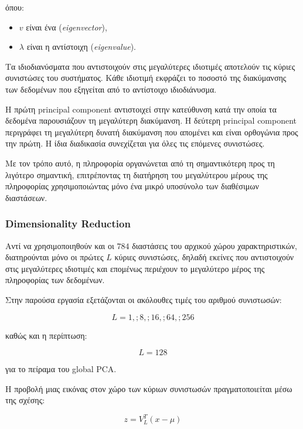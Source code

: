 \documentclass[12pt]{article}
\begin{document}
όπου:

\begin{itemize}
\item $v$ είναι ένα (\textit{eigenvector}),
\item $\lambda$ είναι η αντίστοιχη (\textit{eigenvalue}).
\end{itemize}

Τα ιδιοδιανύσματα που αντιστοιχούν στις μεγαλύτερες ιδιοτιμές αποτελούν τις κύριες συνιστώσες του συστήματος. Κάθε ιδιοτιμή εκφράζει το ποσοστό της 
διακύμανσης των δεδομένων που εξηγείται από το αντίστοιχο ιδιοδιάνυσμα.

Η πρώτη principal component αντιστοιχεί στην κατεύθυνση κατά την οποία τα δεδομένα παρουσιάζουν τη μεγαλύτερη διακύμανση. Η δεύτερη principal component 
περιγράφει τη μεγαλύτερη δυνατή διακύμανση που απομένει και είναι ορθογώνια προς την πρώτη. Η ίδια διαδικασία συνεχίζεται για όλες τις επόμενες 
συνιστώσες.

Με τον τρόπο αυτό, η πληροφορία οργανώνεται από τη σημαντικότερη προς τη λιγότερο σημαντική, επιτρέποντας τη διατήρηση του μεγαλύτερου μέρους της 
πληροφορίας χρησιμοποιώντας μόνο ένα μικρό υποσύνολο των διαθέσιμων διαστάσεων.


\subsubsection{Dimensionality Reduction}
Αντί να χρησιμοποιηθούν και οι $784$ διαστάσεις του αρχικού χώρου χαρακτηριστικών, διατηρούνται μόνο οι πρώτες $L$ κύριες συνιστώσες, δηλαδή εκείνες που 
αντιστοιχούν στις μεγαλύτερες ιδιοτιμές και επομένως περιέχουν το μεγαλύτερο μέρος της πληροφορίας των δεδομένων.

Στην παρούσα εργασία εξετάζονται οι ακόλουθες τιμές του αριθμού συνιστωσών:

\begin{equation}
L = 1,;8,;16,;64,;256
\end{equation}

καθώς και η περίπτωση:

\begin{equation}
L = 128
\end{equation}

για το πείραμα του global PCA.

Η προβολή μιας εικόνας στον χώρο των κύριων συνιστωσών πραγματοποιείται μέσω της σχέσης:

\begin{equation}
z = V_L^{T}(x-\mu)
\end{equation}
\end{document}
